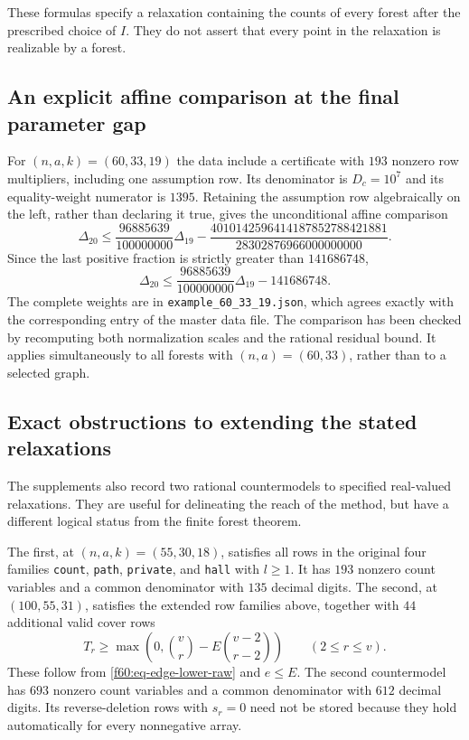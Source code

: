 These formulas specify a relaxation containing the counts of every
forest after the prescribed choice of $I$.  They do not assert that
every point in the relaxation is realizable by a forest.

\subsection{An explicit affine comparison at the final parameter gap}
\label{f60:subsec-example}

For $(n,a,k)=(60,33,19)$ the data include a certificate with $193$
nonzero row multipliers, including one assumption row.  Its denominator
is $D_c=10^7$ and its equality-weight numerator is $1395$.
Retaining the assumption row algebraically on the left, rather than
declaring it true, gives the unconditional affine comparison
\begin{equation}
 \Delta_{20}\le\frac{96885639}{100000000}\Delta_{19}
 -\frac{4010142596414187852788421881}{28302876966000000000}.
 \label{f60:eq-example-exact}
\end{equation}
Since the last positive fraction is strictly greater than $141686748$,
\begin{equation}
 \Delta_{20}\le\frac{96885639}{100000000}\Delta_{19}-141686748.
 \label{f60:eq-example-rounded}
\end{equation}
The complete weights are in \texttt{example\_60\_33\_19.json}, which
agrees exactly with the corresponding entry of the master data file.
The comparison has been checked by recomputing both normalization
scales and the rational residual bound.  It applies simultaneously to
all forests with $(n,a)=(60,33)$, rather than to a selected graph.

\subsection{Exact obstructions to extending the stated relaxations}
\label{f60:subsec-countermodels}

The supplements also record two rational countermodels to specified
real-valued relaxations.  They are useful for delineating the reach of
the method, but have a different logical status from the finite forest
theorem.

The first, at $(n,a,k)=(55,30,18)$, satisfies all rows in the original
four families \texttt{count}, \texttt{path}, \texttt{private}, and
\texttt{hall} with $l\ge1$.  It has $193$ nonzero count variables and
a common denominator with $135$ decimal digits.  The second, at
$(100,55,31)$, satisfies the extended row families above, together
with $44$ additional valid cover rows
\begin{equation}
 T_r\ge\max\left(0,\binom vr-E\binom{v-2}{r-2}\right)
 \qquad(2\le r\le v).
 \label{f60:eq-cover}
\end{equation}
These follow from \eqref{f60:eq-edge-lower-raw} and $e\le E$.
The second countermodel has $693$ nonzero count variables and a common
denominator with $612$ decimal digits.  Its reverse-deletion rows with
$s_r=0$ need not be stored because they hold automatically for every
nonnegative array.

